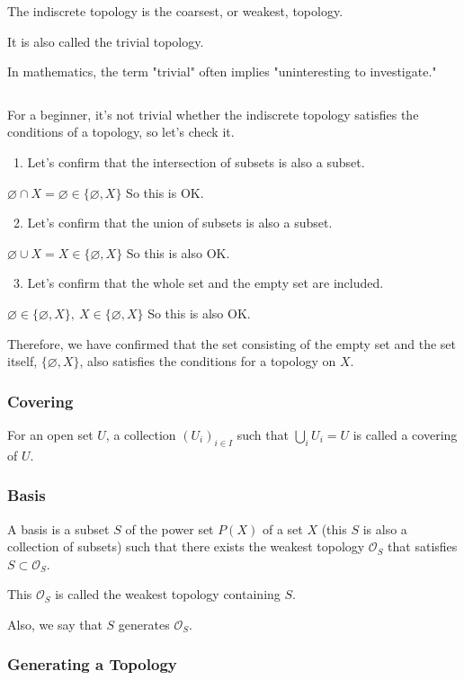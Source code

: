 \documentclass[article,letterpaper,12pt]{jsarticle}
\begin{document}
The indiscrete topology is the coarsest, or weakest, topology.

It is also called the trivial topology.

In mathematics, the term "trivial" often implies "uninteresting to investigate."

${}$

For a beginner, it's not trivial whether the indiscrete topology satisfies the conditions of a topology, so let's check it.

\ 1. Let's confirm that the intersection of subsets is also a subset.

$\varnothing \cap X = \varnothing \in \{ \varnothing, X \}$
So this is OK.

\ 2. Let's confirm that the union of subsets is also a subset.

$\varnothing \cup X = X \in \{ \varnothing, X \}$
So this is also OK.

\ 3. Let's confirm that the whole set and the empty set are included.

$\varnothing \in \{ \varnothing, X \} , \ X \in \{ \varnothing, X \}$
So this is also OK.

Therefore, we have confirmed that the set consisting of the empty set and the set itself, $\{ \varnothing, X \}$, also satisfies the conditions for a topology on $X$.



\subsubsection{Covering}

For an open set $U$, a collection $(U_{i})_{i \in I}$ such that $\bigcup_{i} U_{i} = U$ is called a covering of $U$.


\subsubsection{Basis}

A basis is a subset $S$ of the power set $P(X)$ of a set $X$
(this $S$ is also a collection of subsets)
such that
there exists the weakest topology ${\mathcal O}_{S}$
that satisfies $S \subset {\mathcal O}_{S}$.

This ${\mathcal O}_{S}$ is
called the weakest topology containing $S$.

Also, we say that $S$ generates ${\mathcal O}_{S}$.

\subsubsection{Generating a Topology}
\end{document}
